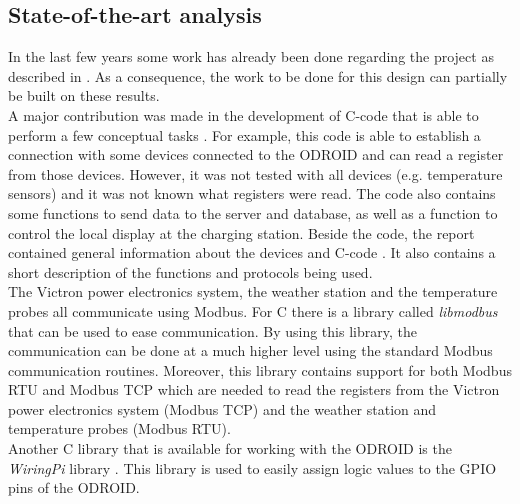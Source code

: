 \subsection{State-of-the-art analysis}
In the last few years some work has already been done regarding the project as described in . As a consequence, the work to be done for this design can partially be built on these results.\\

A major contribution was made in the development of C-code that is able to perform a few conceptual tasks \cite{report_pavel}. For example, this code is able to establish a connection with some devices connected to the ODROID and can read a register from those devices. However, it was not tested with all devices (e.g. temperature sensors) and it was not known what registers were read. The code also contains some functions to send data to the server and database, as well as a function to control the local display at the charging station. Beside the code, the report contained general information about the devices and C-code \cite{report_pavel}. It also contains a short description of the functions and protocols being used.\\

The Victron power electronics system, the weather station and the temperature probes all communicate using Modbus. For C there is a library called \textit{libmodbus} \cite{libmodbus} that can be used to ease communication. By using this library, the communication can be done at a much higher level using the standard Modbus communication routines. Moreover, this library contains support for both Modbus RTU and Modbus TCP which are needed to read the registers from the Victron power electronics system (Modbus TCP) and the weather station and temperature probes (Modbus RTU).\\

Another C library that is available for working with the ODROID is the \textit{WiringPi} library \cite{WiringPi}. This library is used to easily assign logic values to the GPIO pins of the ODROID.\\



